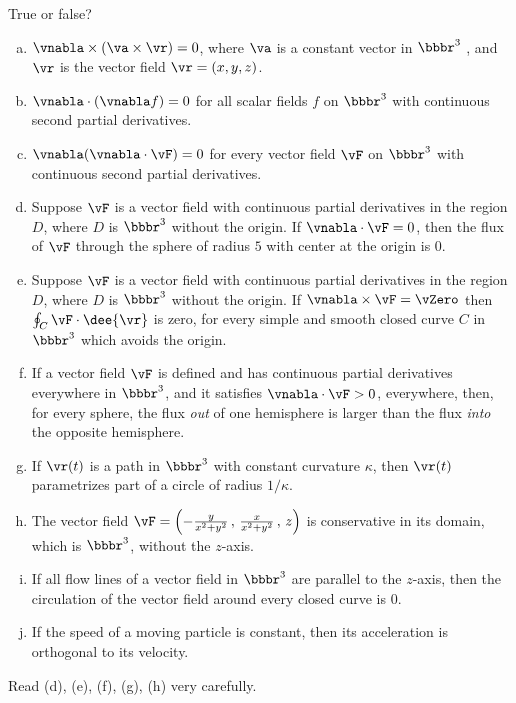 \goodbreak
\begin{question}[M317 2012D] %
True or false?
\begin{enumerate}[(a)]
\item
$\vnabla\times(\va \times\vr) = 0$, where $\va$ is a constant vector in 
$\bbbr^3$ , and $\vr$ is the vector field $\vr= (x, y, z)$.
\item
$\vnabla\cdot(\vnabla f) = 0$ for all scalar fields $f$ on $\bbbr^3$ 
with continuous second partial derivatives.
\item
$\vnabla(\vnabla\cdot \vF) = 0$ for every vector field $\vF$ on $\bbbr^3$ 
with continuous second partial derivatives.
\item
Suppose $\vF$ is a vector field with continuous partial derivatives 
in the region $D$, where $D$ is $\bbbr^3$ without the origin.  If $\vnabla\cdot\vF = 0$,  then the flux of $\vF$ through
the sphere of radius $5$ with center at the origin is $0$.
\item
Suppose $\vF$ is a vector field with continuous partial derivatives 
in the region $D$, where $D$ is $\bbbr^3$ without the origin. If 
$\vnabla\times\vF=\vZero$ then  $\oint_C\vF\cdot\dee{\vr}$ is zero, for 
every simple and smooth closed curve $C$ in $\bbbr^3$ which avoids the origin.
\item
If a vector field $\vF$ is defined and has continuous partial 
derivatives everywhere in $\bbbr^3$, and it satisfies $\vnabla\cdot\vF > 0$, everywhere, then, for every sphere, the flux \emph{out} of one hemisphere 
is larger than  the flux \emph{into} the opposite hemisphere.
\item
If $\vr(t)$ is a path in $\bbbr^3$ 
with constant curvature $\kappa$, then $\vr(t)$ parametrizes part of a 
circle of radius $1/\kappa$.
\item
The vector field $\vF = \left( -\frac{y}{x^2+y^2}\,,\,\frac{x}{x^2+y^2}
\,,\,z\right)$
is conservative in its domain, which is $\bbbr^3$, without the $z$-axis.
\item
If all flow lines of a vector field in $\bbbr^3$ are parallel to the 
$z$-axis, then the circulation of the vector field around every closed 
curve is $0$.
\item
If the speed of a moving particle is constant, then its acceleration 
is orthogonal to its velocity.
\end{enumerate}
\end{question}

\begin{hint} 
Read (d), (e), (f), (g), (h) very carefully.
\end{hint}

